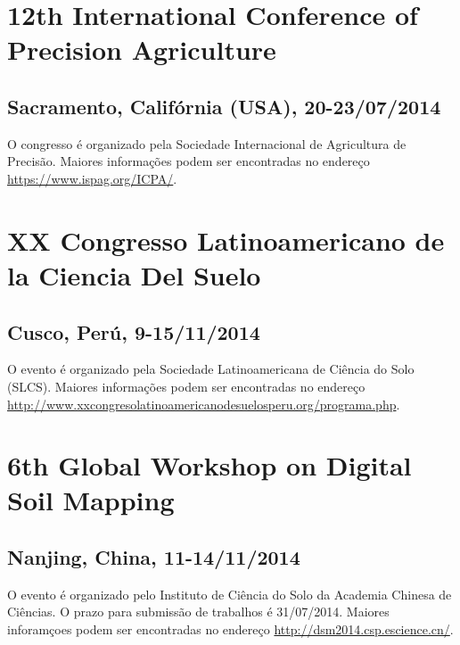 \section{12th International Conference of Precision Agriculture}
\subsection{Sacramento, Califórnia (USA), 20-23/07/2014}
O congresso é organizado pela Sociedade Internacional de Agricultura de Precisão.
Maiores informações podem ser encontradas no endereço \url{https://www.ispag.org/ICPA/}.


\section{XX Congresso Latinoamericano de la Ciencia Del Suelo}
\subsection{Cusco, Perú, 9-15/11/2014}
O evento é organizado pela Sociedade Latinoamericana de Ciência do Solo (SLCS).
Maiores informações podem ser encontradas no endereço \url{http://www.xxcongresolatinoamericanodesuelosperu.org/programa.php}.


\section{6th Global Workshop on Digital Soil Mapping}
\subsection{Nanjing, China, 11-14/11/2014}
O evento é  organizado pelo Instituto de Ciência do Solo da Academia Chinesa de Ciências. O prazo para submissão de trabalhos é 31/07/2014.
Maiores inforamçoes podem ser encontradas no endereço \url{http://dsm2014.csp.escience.cn/}.


\address{Jean Michel Moura-Bueno\\
    Universidade Federal de Santa Maria\\
    }